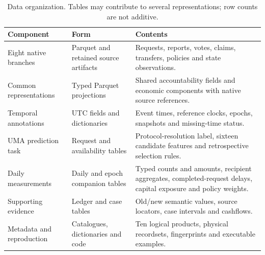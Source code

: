 \begin{table}[!htbp]
\centering\tabstyle
\caption{Data organization. Tables may contribute to several representations; row counts are not additive.}
\label{tab:files}
\begin{tabularx}{\linewidth}{@{}L{.25\linewidth}L{.21\linewidth}Y@{}}
\toprule Component & Form & Contents \\ \midrule
Eight native branches & Parquet and retained source artifacts & Requests, reports, votes, claims, transfers, policies and state observations. \\
Common representations & Typed Parquet projections & Shared accountability fields and economic components with native source references. \\
Temporal annotations & UTC fields and dictionaries & Event times, reference clocks, epochs, snapshots and missing-time status. \\
UMA prediction task & Request and availability tables & Protocol-resolution label, sixteen candidate features and retrospective selection rules. \\
Daily measurements & Daily and epoch companion tables & Typed counts and amounts, recipient aggregates, completed-request delays, capital exposure and policy weights. \\
Supporting evidence & Ledger and case tables & Old/new semantic values, source locators, case intervals and cashflows. \\
Metadata and reproduction & Catalogues, dictionaries and code & Ten logical products, physical recordsets, fingerprints and executable examples. \\
\bottomrule
\end{tabularx}
\end{table}
